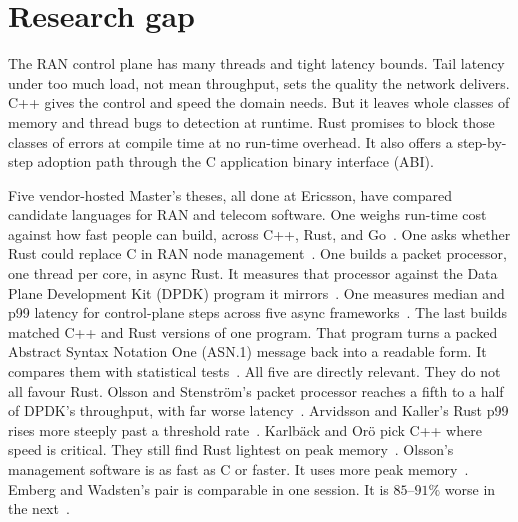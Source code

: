 \documentclass[english,oneside,a4paper,censored,csm,software-track-2020]{HYthesisML}
\begin{document}
\section{Research gap}\label{sec:gap}
The RAN control plane has many threads and
tight latency bounds. Tail latency under too much load, not mean throughput, sets
the quality the network delivers. C++ gives the control and speed the domain
needs. But it leaves whole classes of memory and thread bugs to detection
at runtime. Rust promises to block those classes of errors at compile time at no
run-time overhead. It also offers a step-by-step adoption path through the C
application binary interface (ABI).

Five vendor-hosted Master's theses, all
done at Ericsson, have compared candidate languages for RAN and telecom
software. One weighs run-time cost against how fast people can build, across
C++, Rust, and Go~\cite{karlback2021ran}. One asks whether Rust could replace
C in RAN node management~\cite{olsson2023ranmgmt}. One builds a packet
processor, one thread per core, in async Rust. It measures that processor
against the Data Plane Development Kit (DPDK) program it
mirrors~\cite{olsson2023asyncpackets}. One measures median and p99 latency for
control-plane steps across five async
frameworks~\cite{arvidsson2025async}. The last builds matched C++ and Rust
versions of one program. That program turns a packed Abstract Syntax Notation
One (ASN.1) message back into a readable form. It compares
them with statistical tests~\cite{emberg2023asn1}. All five are directly
relevant. They do not all favour Rust. Olsson and Stenstr\"om's packet
processor reaches a fifth to a half of DPDK's throughput, with far worse
latency~\cite{olsson2023asyncpackets}. Arvidsson and Kaller's Rust p99 rises
more steeply past a threshold rate~\cite{arvidsson2025async}. Karlb\"ack and
Or\"o pick C++ where speed is critical. They still find Rust lightest on peak
memory~\cite{karlback2021ran}. Olsson's management software is as fast as C or
faster. It uses more peak memory~\cite{olsson2023ranmgmt}. Emberg and
Wadsten's pair is comparable in one session. It is $85$--$91\%$ worse in the
next~\cite{emberg2023asn1}.
\end{document}
